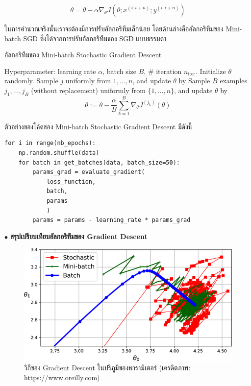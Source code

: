 \begin{equation}\label{eq:minibatch}
    \theta = \theta - \alpha\nabla_\theta J( \theta; x^{(i:i+n)}; y^{(i:i+n)})
\end{equation}

ในการคำนวณจริงนั้นเราจะต้องมีการปรับอัลกอริทึมเล็กน้อย โดยด้านล่างคืออัลกอริทึมของ Mini-batch SGD ซึ่งได้จากการปรับอัลกอริทึมของ SGD
แบบธรรมดา

\begin{algorithm}[H]
    \caption{อัลกอริทึมของ Mini-batch Stochastic Gradient Descent}
    \label{alg:minibatch}
    \begin{algorithmic}
        \State Hyperparameter: learning rate $\alpha$, batch size $B$, \# iteration $n_\text{iter}$.
        \State Initialize $\theta$ randomly.
        \State Sample $j$ uniformly from ${1,\ldots,n}$, and update $\theta$ by
        \State Sample $B$ examples $j_1,\ldots,j_B$ (without replacement) uniformly from $\{1,\ldots,n\}$,
        and update $\theta$ by
        \begin{equation*}
            \theta := \theta - \frac{\alpha}{B}\sum_{k=1}^B\nabla_\theta J^{(j_k)}(\theta)
        \end{equation*}
        \EndFor
    \end{algorithmic}
\end{algorithm}

\noindent ตัวอย่างของโค้ดของ Mini-batch Stochastic Gradient Descent มีดังนี้

\begin{lstlisting}[style=MyPython]
for i in range(nb_epochs):
    np.random.shuffle(data)
    for batch in get_batches(data, batch_size=50):
        params_grad = evaluate_gradient(
            loss_function, 
            batch, 
            params
            )
        params = params - learning_rate * params_grad
\end{lstlisting}

\vspace{1em}
\noindent $\bullet$ \textbf{สรุปเปรียบเทียบอัลกอริทึมของ Gradient Descent}

\begin{figure}[H]
    \centering
    \includegraphics[width=0.9\linewidth]{fig/gradient_descent_path.png}
    \caption{วิถีของ Gradient Descent ในปริภูมิของพารามิเตอร์ (เครดิตภาพ: https://www.oreilly.com)}
    \label{fig:gradient_descent_path}
\end{figure}

